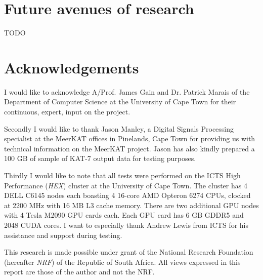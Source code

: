 \documentclass{acm_proc_article-sp}
\begin{document}
\section{Future avenues of research}
{\color{red}TODO}
\section{Acknowledgements}
I would like to acknowledge A/Prof. James Gain and Dr. Patrick Marais of the Department of Computer Science at the University of Cape Town for their continuous, expert, input on the project.

Secondly I would like to thank Jason Manley, a Digital Signals Processing specialist at the MeerKAT offices in Pinelands, Cape Town for providing us with technical information
on the MeerKAT project. Jason has also kindly prepared a 100 GB of sample of KAT-7 output data for testing purposes.

Thirdly I would like to note that all tests were performed on the ICTS High Performance (\textit{HEX}) cluster at the University of Cape Town. The cluster has 4 DELL C6145 nodes each boasting 4 16-core
AMD Opteron 6274 CPUs, clocked at 2200 MHz with 16 MB L3 cache memory. There are two additional GPU nodes with 4 Tesla M2090 GPU cards each. Each GPU card has 6 GB GDDR5 and 2048 CUDA cores. I want to 
especially thank Andrew Lewis from ICTS for his assistance and support during testing.

This research is made possible under grant of the National Research Foundation (hereafter \textit{NRF}) of the Republic of South Africa. All views expressed in this report are those of the author and not the NRF.


\end{document}
